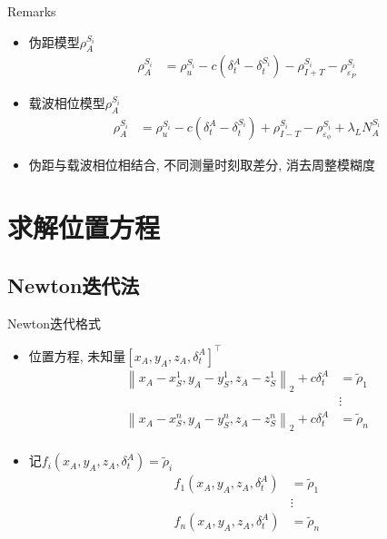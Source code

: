 \begin{frame}{Remarks}
    \begin{itemize}
        \item 伪距模型$\rho _ A ^ { S _ i }$
        \begin{align*}
            \rho _ A ^ { S _ i } &= \rho _ u ^ { S _ i } - c \left( \delta _ t ^ A 
            - \delta _ t ^ { S _ i } \right)
            - \rho _ { I + T } ^ { S _ i } - \rho _ {\varepsilon _ P} ^ { S _ i }
        \end{align*}
        \item 载波相位模型$\rho _ A ^ { S _ i }$
        \begin{align*}
            \rho _ A ^ { S _ i } &= \rho _ u ^ { S _ i } - c \left( \delta _ t ^ A 
            - \delta _ t ^ { S _ i } \right) 
            + \rho _ { I - T } ^ { S _ i } - \rho _ { \varepsilon _ \phi } ^ { S _ i }
            + \lambda _ L N _ A ^ { S _ i }
        \end{align*}
        \item 伪距与载波相位相结合, 不同测量时刻取差分, 消去周整模糊度
    \end{itemize}
\end{frame}

\section{求解位置方程}

\subsection{Newton迭代法}
\begin{frame}{Newton迭代格式}
    \begin{itemize}
        \item 位置方程, 未知量$\left[ x _ A, y _ A, z _ A, \delta _ t ^ A \right] ^ \top$
        \begin{align*}
            \left\| x _ A - x _ S ^ 1, y _ A - y _ S ^ 1, z _ A - z _ S ^ 1 \right\| _ 2 
            + c \delta _ t ^ A &= \tilde \rho _ 1 \\
            &\vdots \\
            \left\| x _ A - x _ S ^ n, y _ A - y _ S ^ n, z _ A - z _ S ^ n \right\| _ 2 
            + c \delta _ t ^ A &= \tilde \rho _ n \\
        \end{align*}
        \item 记$f _ i \left( x _ A, y _ A, z _ A, \delta _ t ^ A \right) = \tilde \rho _ i$
        \begin{align*}
            f _ 1 \left( x _ A, y _ A, z _ A, \delta _ t ^ A \right) &= \tilde \rho _ 1 \\
            &\vdots \\
            f _ n \left( x _ A, y _ A, z _ A, \delta _ t ^ A \right) &= \tilde \rho _ n \\
        \end{align*}
    \end{itemize}
\end{frame}

